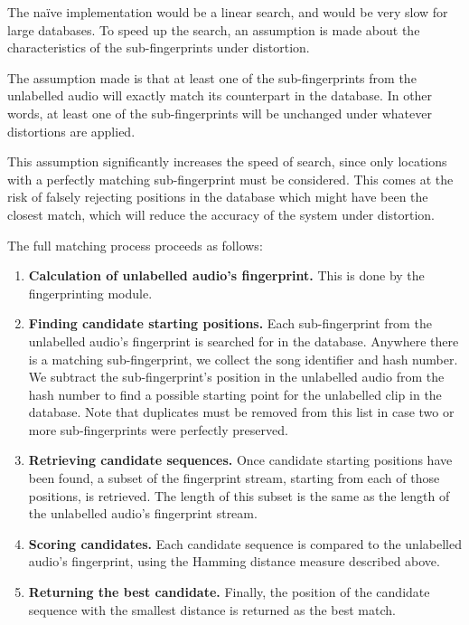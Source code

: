 \documentclass[12pt,a4paper,twoside,openright]{report}
\begin{document}
The na\"ive implementation would be a linear search, and would be very slow for large databases. To speed up the search, an assumption is made about the characteristics of the sub-fingerprints under distortion. 

The assumption made is that at least one of the sub-fingerprints from the unlabelled audio will exactly match its counterpart in the database. In other words, at least one of the sub-fingerprints will be unchanged under whatever distortions are applied.

This assumption significantly increases the speed of search, since only locations with a perfectly matching sub-fingerprint must be considered. This comes at the risk of falsely rejecting positions in the database which might have been the closest match, which will reduce the accuracy of the system under distortion.

The full matching process proceeds as follows:

\begin{enumerate}

  \item \textbf{Calculation of unlabelled audio's fingerprint.} This is done by the fingerprinting module.

  \item \textbf{Finding candidate starting positions.} Each sub-fingerprint from the unlabelled audio's fingerprint is searched for in the database. Anywhere there is a matching sub-fingerprint, we collect the song identifier and hash number. We subtract the sub-fingerprint's position in the unlabelled audio from the hash number to find a possible starting point for the unlabelled clip in the database. Note that duplicates must be removed from this list in case two or more sub-fingerprints were perfectly preserved.

  \item \textbf{Retrieving candidate sequences.} Once candidate starting positions have been found, a subset of the fingerprint stream, starting from each of those positions, is retrieved. The length of this subset is the same as the length of the unlabelled audio's fingerprint stream.

  \item \textbf{Scoring candidates.} Each candidate sequence is compared to the unlabelled audio's fingerprint, using the Hamming distance measure described above.

  \item \textbf{Returning the best candidate.} Finally, the position of the candidate sequence with the smallest distance is returned as the best match.

\end{enumerate}
\end{document}
